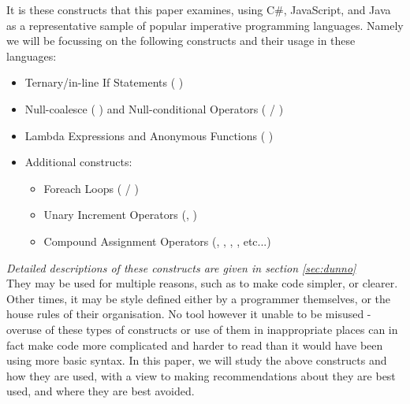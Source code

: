 \documentclass{article}
\begin{document}
        It is these constructs that this paper examines, using C\#, JavaScript, and Java as a representative sample of popular imperative programming languages. Namely we will be focussing on the following constructs and their usage in these languages:
        
        \begin{itemize}
            \item Ternary/in-line If Statements (  )
            \item Null-coalesce (  ) and Null-conditional Operators (  / )
            \item Lambda Expressions and Anonymous Functions (  )
            \item Additional constructs:
            \begin{itemize}
                \item Foreach Loops (  / )
                \item Unary Increment Operators (, )
                \item Compound Assignment Operators (,  , , , etc...)
            \end{itemize}
        \end{itemize}
        
        \emph{Detailed descriptions of these constructs are given in section \ref{sec:dunno}}\\

        They may be used for multiple reasons, such as to make code simpler, or clearer. Other times, it may be style defined either by a programmer themselves, or the house rules of their organisation. No tool however it unable to be misused - overuse of these types of constructs or use of them in inappropriate places can in fact make code more complicated and harder to read than it would have been using more basic syntax. In this paper, we will study the above constructs and how they are used, with a view to making recommendations about they are best used, and where they are best avoided.
\end{document}
